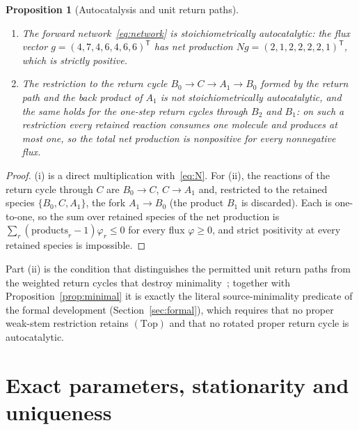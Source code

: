 \documentclass[11pt,a4paper]{article}
\theoremstyle{plain}
\newtheorem{proposition}[theorem]{Proposition}
\theoremstyle{definition}
\theoremstyle{remark}
\numberwithin{equation}{section}
\newcommand{\Top}{\mathrm{(Top)}}
\begin{document}
\begin{proposition}[Autocatalysis and unit return paths]\label{prop:auto}
\begin{enumerate}[label=\textup{(\roman*)}]
\item The forward network~\eqref{eq:network} is stoichiometrically autocatalytic: the flux vector $g=(4,7,4,6,4,6,6)^{\mathsf T}$ has net production $Ng=(2,1,2,2,2,2,1)^{\mathsf T}$, which is strictly positive.
\item The restriction to the return cycle $B_0\to C\to A_1\to B_0$ formed by the return path and the back product of $A_1$ is not stoichiometrically autocatalytic, and the same holds for the one-step return cycles through $B_2$ and $B_1$: on such a restriction every retained reaction consumes one molecule and produces at most one, so the total net production is nonpositive for every nonnegative flux.
\end{enumerate}
\end{proposition}

\begin{proof}
(i) is a direct multiplication with~\eqref{eq:N}. For (ii), the reactions of the return cycle through $C$ are $B_0\to C$, $C\to A_1$ and, restricted to the retained species $\{B_0,C,A_1\}$, the fork $A_1\to B_0$ (the product $B_1$ is discarded). Each is one-to-one, so the sum over retained species of the net production is $\sum_r(\text{products}_r-1)\varphi_r\le0$ for every flux $\varphi\ge0$, and strict positivity at every retained species is impossible.
\end{proof}

Part (ii) is the condition that distinguishes the permitted unit return paths from the weighted return cycles that destroy minimality~\cite[Lemma~2.4]{TypeIImixed}; together with Proposition~\ref{prop:minimal} it is exactly the literal source-minimality predicate of the formal development (Section~\ref{sec:formal}), which requires that no proper weak-stem restriction retains $\Top$ and that no rotated proper return cycle is autocatalytic.

\section{Exact parameters, stationarity and uniqueness}\label{sec:data}
\end{document}
